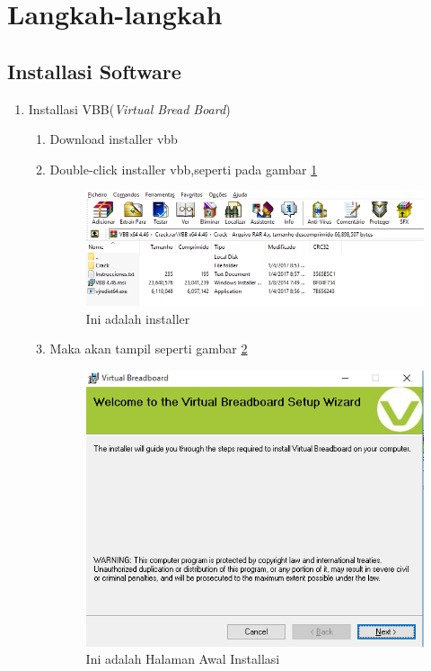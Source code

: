 \section{Langkah-langkah}
\subsection{Installasi Software}
\begin{enumerate}
  \item Installasi VBB(\textit{Virtual Bread Board})
    \begin{enumerate}
        \item Download installer vbb
        \item Double-click installer vbb,seperti pada gambar \ref{fig:installer}
            \begin{figure}[!htbp]
            \centering
            \includegraphics[width=.75\textwidth]{figures/VBB/installer.png}
            \caption{Ini adalah installer}\label{fig:installer}
            \end{figure}
        \item Maka akan tampil seperti gambar \ref{fig:halawalinstallasi}
            \begin{figure}[!htbp]
            \centering
            \includegraphics[width=.75\textwidth]{figures/VBB/halawalinstallasi.png}
            \caption{Ini adalah Halaman Awal Installasi}\label{fig:halawalinstallasi}

\end{figure}
\end{enumerate}
\end{enumerate}
